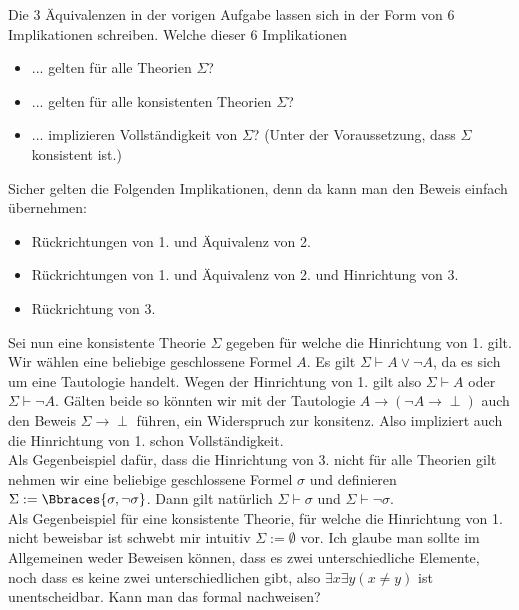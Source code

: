 
\begin{exercise}[114]

Die 3 Äquivalenzen in der vorigen Aufgabe lassen sich in der Form von 6
Implikationen schreiben. Welche dieser 6 Implikationen
\begin{itemize}
  \item ... gelten für alle Theorien $\Sigma$?
  \item ... gelten für alle konsistenten Theorien $\Sigma$?
  \item ... implizieren Vollständigkeit von $\Sigma$? (Unter der Voraussetzung,
  dass $\Sigma$ konsistent ist.)
\end{itemize}
\end{exercise}


\begin{solution}

Sicher gelten die Folgenden Implikationen, denn da kann man den Beweis einfach übernehmen:
\begin{itemize}
  \item Rückrichtungen von 1. und Äquivalenz von 2. 
  \item Rückrichtungen von 1. und Äquivalenz von 2. und Hinrichtung von 3.
  \item Rückrichtung von 3.
\end{itemize}
Sei nun eine konsistente Theorie $\Sigma$ gegeben für welche die Hinrichtung von 1. gilt. Wir wählen eine beliebige geschlossene Formel $A$. Es gilt $\Sigma \vdash A \lor \neg A$, da es sich um eine Tautologie handelt. Wegen der Hinrichtung von 1. gilt also $\Sigma \vdash A$ oder $\Sigma \vdash \neg A$. Gälten beide so könnten wir mit der Tautologie $A \rightarrow (\neg A \rightarrow \perp)$ auch den Beweis $\Sigma \rightarrow \perp$ führen, ein Widerspruch zur konsitenz. Also impliziert auch die Hinrichtung von 1. schon Vollständigkeit. \\
Als Gegenbeispiel dafür, dass die Hinrichtung von 3. nicht für alle Theorien gilt nehmen wir eine beliebige geschlossene Formel $\sigma$ und definieren $\Sigma := \Bbraces{\sigma, \neg \sigma}$. Dann gilt natürlich $\Sigma \vdash \sigma$ und $\Sigma \vdash \neg \sigma$. \\
Als Gegenbeispiel für eine konsistente Theorie, für welche die Hinrichtung von 1. nicht beweisbar ist schwebt mir intuitiv $\Sigma := \emptyset$ vor. Ich glaube man sollte im Allgemeinen weder Beweisen können, dass es zwei unterschiedliche Elemente, noch dass es keine zwei unterschiedlichen gibt, also $\exists x \exists y(x \neq y)$ ist unentscheidbar. Kann man das formal nachweisen?

\end{solution}

